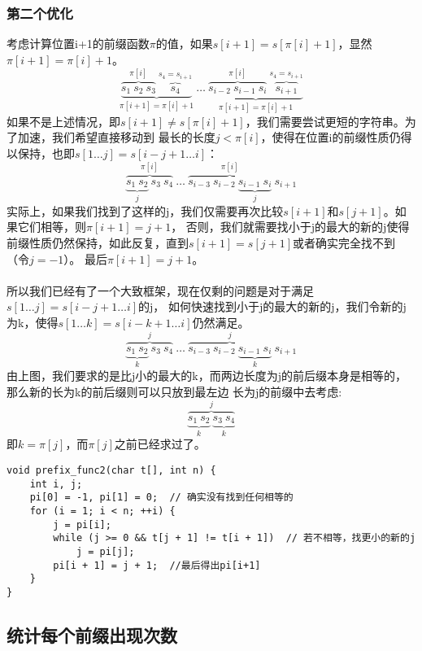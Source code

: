         \subsubsection{第二个优化}
            考虑计算位置i+1的前缀函数$\pi$的值，如果$s[i+1]=s[\pi[i]+1]$，显然$\pi[i+1]=\pi[i]+1$。
            $$ \underbrace{\overbrace{s_1 ~ s_2 ~ s_3}^{\pi[i]} ~ \overbrace{s_4}^{s_4 = s_{i+1}}}_{\pi[i+1] = \pi[i] + 1} ~ \dots ~ \underbrace{\overbrace{s_{i-2} ~ s_{i-1} ~ s_{i}}^{\pi[i]} ~ \overbrace{s_{i+1}}^{s_4 = s_{i+1}}}_{\pi[i+1] = \pi[i] + 1} $$
            如果不是上述情况，即$s[i+1] \neq s[\pi[i]+1]$，我们需要尝试更短的字符串。为了加速，我们希望直接移动到
            最长的长度$j<\pi[i]$，使得在位置i的前缀性质仍得以保持，也即$s[1 \dots j] = s[i-j+1 \dots i]$：
            $$\overbrace{\underbrace{s_1 ~ s_2}_j ~ s_3 ~ s_4}^{\pi[i]} ~ \dots ~ \overbrace{s_{i-3} ~ s_{i-2} ~ \underbrace{s_{i-1} ~ s_{i}}_j}^{\pi[i]} ~ s_{i+1}$$
            实际上，如果我们找到了这样的j，我们仅需要再次比较$s[i+1]$和$s[j+1]$。如果它们相等，则$\pi[i+1]=j+1$，
            否则，我们就需要找小于j的最大的新的j使得前缀性质仍然保持，如此反复，直到$s[i+1]=s[j+1]$或者确实完全找不到（令$j=-1$）。
            最后$\pi[i+1]=j+1$。\\\\
            所以我们已经有了一个大致框架，现在仅剩的问题是对于满足$s[1 \dots j] = s[i-j+1 \dots i]$的j，
            如何快速找到小于j的最大的新的j，我们令新的j为k，使得$s[1 \dots k] = s[i-k+1 \dots i]$仍然满足。
            $$\overbrace{\underbrace{s_1 ~ s_2}_k ~ s_3 ~ s_4}^j ~ \dots ~ \overbrace{s_{i-3} ~ s_{i-2} ~ \underbrace{s_{i-1} ~ s_{i}}_k}^j ~s_{i+1}$$
            由上图，我们要求的是比j小的最大的k，而两边长度为j的前后缀本身是相等的，那么新的长为k的前后缀则可以只放到最左边
            长为j的前缀中去考虑:
            $$\overbrace{\underbrace{s_1 ~ s_2}_k ~ \underbrace{s_3 ~ s_4}_k}^j$$
            即$k=\pi[j]$，而$\pi[j]$之前已经求过了。
            \begin{lstlisting}
void prefix_func2(char t[], int n) {
    int i, j;
    pi[0] = -1, pi[1] = 0;  // 确实没有找到任何相等的
    for (i = 1; i < n; ++i) {
        j = pi[i];
        while (j >= 0 && t[j + 1] != t[i + 1])  // 若不相等，找更小的新的j
            j = pi[j];
        pi[i + 1] = j + 1;  //最后得出pi[i+1]
    }
}
            \end{lstlisting}
    
    \subsection{统计每个前缀出现次数}
        